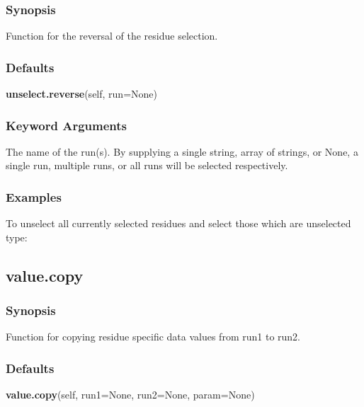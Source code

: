 \subsubsection{Synopsis}

Function for the reversal of the residue selection.



\subsubsection{Defaults}

\textsf{\textbf{unselect.reverse}(self, run=None)}


\subsubsection{Keyword Arguments}

  The name of the run(s).  By supplying a single string, array of strings, or None, a single run, multiple runs, or all runs will be selected respectively. 




\subsubsection{Examples}

To unselect all currently selected residues and select those which are unselected type:





\newpage

\subsection{value.copy}


\subsubsection{Synopsis}

Function for copying residue specific data values from run1 to run2.



\subsubsection{Defaults}

\textsf{\textbf{value.copy}(self, run1=None, run2=None, param=None)}


